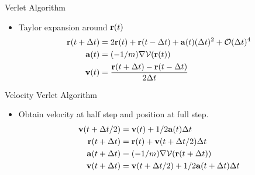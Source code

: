 \documentclass[slidestop,mathserif,compress,xcolor=svgnames]{beamer}
\newenvironment{bblock}[0]
{
\begin{beamerboxesrounded}[upper=uppercol1,lower=lowercol1,shadow=true]}
{\end{beamerboxesrounded}}
\begin{document}
\begin{frame}[allowframebreaks]
  \begin{bblock}{Verlet Algorithm}
    \begin{itemize}
    \item Taylor expansion around ${\bf r}(t)$
      \begin{align*}
        {\bf r}(t+\Delta t) &= 2{\bf r}(t) + {\bf r}(t-\Delta t) + {\bf a}(t)({\Delta t})^2 + \mathcal{O}(\Delta t)^4\\
        {\bf a}(t) &= (-1/m)\nabla\mathcal{V}({\bf r}(t))\\
        {\bf v}(t) &= \dfrac{{\bf r}(t+\Delta t) - {\bf r}(t-\Delta t) }{2\Delta t}
      \end{align*}
    \end{itemize}
  \end{bblock}

\begin{bblock}{Velocity Verlet Algorithm}
  \begin{itemize}
  \item Obtain velocity at half step and position at full step.
    \begin{align*}
      {\bf v}(t+\Delta t/2) &=  {\bf v}(t)  + 1/2{\bf a}(t){\Delta t}\\
      {\bf r}(t+\Delta t) &= {\bf r}(t) + {\bf v}(t+\Delta t/2)\Delta t\\
      {\bf a}(t+\Delta t) &= (-1/m)\nabla\mathcal{V}({\bf r}(t+\Delta t))\\
      {\bf v}(t+\Delta t) &= {\bf v}(t+\Delta t/2) + 1/2{\bf a}(t+\Delta t)\Delta t
    \end{align*}
  \end{itemize}
\end{bblock}


\end{frame}
\end{document}
